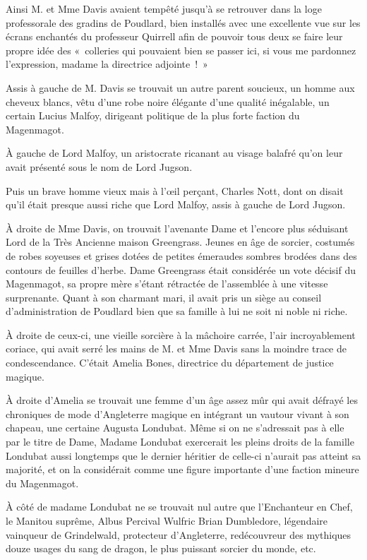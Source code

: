Ainsi M. et Mme Davis avaient tempêté jusqu'à se retrouver dans la loge professorale des gradins de Poudlard, bien installés avec une excellente vue sur les écrans enchantés du professeur Quirrell afin de pouvoir tous deux se faire leur propre idée des «~colleries qui pouvaient bien se passer ici, si vous me pardonnez l'expression, madame la directrice adjointe~!~»

Assis à gauche de M. Davis se trouvait un autre parent soucieux, un homme aux cheveux blancs, vêtu d'une robe noire élégante d'une qualité inégalable, un certain Lucius Malfoy, dirigeant politique de la plus forte faction du Magenmagot.

À gauche de Lord Malfoy, un aristocrate ricanant au visage balafré qu'on leur avait présenté sous le nom de Lord Jugson.

Puis un brave homme vieux mais à l'œil perçant, Charles Nott, dont on disait qu'il était presque aussi riche que Lord Malfoy, assis à gauche de Lord Jugson.

À droite de Mme Davis, on trouvait l'avenante Dame et l'encore plus séduisant Lord de la Très Ancienne maison Greengrass.
Jeunes en âge de sorcier, costumés de robes soyeuses et grises dotées de petites émeraudes sombres brodées dans des contours de feuilles d'herbe.
Dame Greengrass était considérée un vote décisif du Magenmagot, sa propre mère s'étant rétractée de l'assemblée à une vitesse surprenante.
Quant à son charmant mari, il avait pris un siège au conseil d'administration de Poudlard bien que sa famille à lui ne soit ni noble ni riche.

À droite de ceux-ci, une vieille sorcière à la mâchoire carrée, l'air incroyablement coriace, qui avait serré les mains de M. et Mme Davis sans la moindre trace de condescendance.
C'était Amelia Bones, directrice du département de justice magique.

À droite d'Amelia se trouvait une femme d'un âge assez mûr qui avait défrayé les chroniques de mode d'Angleterre magique en intégrant un vautour vivant à son chapeau, une certaine Augusta Londubat.
Même si on ne s'adressait pas à elle par le titre de Dame, Madame Londubat exercerait les pleins droits de la famille Londubat aussi longtemps que le dernier héritier de celle-ci n'aurait pas atteint sa majorité, et on la considérait comme une figure importante d'une faction mineure du Magenmagot.

À côté de madame Londubat ne se trouvait nul autre que l'Enchanteur en Chef, le Manitou suprême, Albus Percival Wulfric Brian Dumbledore, légendaire vainqueur de Grindelwald, protecteur d'Angleterre, redécouvreur des mythiques douze usages du sang de dragon, le plus puissant sorcier du monde, etc.


